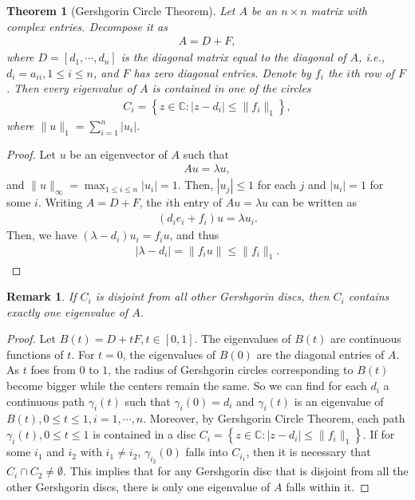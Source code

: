 \documentclass[10pt]{book}
\newtheorem{theorem}{Theorem}[chapter]
\newtheorem{remark}{Remark}[chapter]
\theoremstyle{definition}
\numberwithin{equation}{chapter}
\begin{document}
\begin{subappendices}
\begin{theorem}[Gershgorin Circle Theorem]
Let $A$ be an $n \times n$ matrix with complex entries. Decompose it as 
\begin{align*}
    A = D + F,
\end{align*}
where $D = \left[d_1, \cdots, d_n\right]$ is the diagonal matrix equal to the diagonal of $A$, i.e., $d_i = a_{ii}, 1 \leq i \leq n$, and $F$ has zero diagonal entries. Denote by $f_i$ the $i$th row of $F$. Then every eigenvalue of $A$ is contained in one of the circles
\begin{align*}
    C_i = \left\{z \in \mathbb{C}: |z - d_i| \leq \|f_i\|_1 \right\},
\end{align*}
where $\|u\|_1 = \sum^n_{i=1} |u_i|$.
\end{theorem}
\begin{proof}
Let $u$ be an eigenvector of $A$ such that
\begin{align*}
    Au = \lambda u,
\end{align*}
and $\|u\|_\infty = \max_{1\leq i \leq n}|u_i| = 1$. Then, $|u_j| \leq 1$ for each $j$ and $|u_i| = 1$ for some $i$. Writing $A = D + F$, the $i$th entry of $Au = \lambda u$ can be written as 
\begin{align*}
    (d_i e_i + f_i)u = \lambda u_i.
\end{align*}
Then, we have $(\lambda - d_i)u_i = f_i u$, and thus
\begin{align*}
    |\lambda - d_i| = \|f_i u\| \leq \|f_i\|_1.
\end{align*}
\end{proof}

\begin{remark}
If $C_i$ is disjoint from all other Gershgorin discs, then $C_i$ contains exactly one eigenvalue of $A$.
\end{remark}
\begin{proof}
Let $B(t) = D + tF, t \in [0,1]$. The eigenvalues of $B(t)$ are continuous functions of $t$. For $t = 0$, the eigenvalues of $B(0)$ are the diagonal entries of $A$. As $t$ foes from $0$ to $1$, the radius of Gershgorin circles corresponding to $B(t)$ become bigger while the centers remain the same. So we can find for each $d_i$ a continuous path $\gamma_i(t)$ such that $\gamma_i(0) = d_i$ and $\gamma_i(t)$ is an eigenvalue of $B(t), 0 \leq t \leq 1, i = 1, \cdots, n$. Moreover, by Gershgorin Circle Theorem, each path $\gamma_i(t), 0 \leq t \leq 1$ is contained in a disc $C_i = \left\{z \in \mathbb{C}: |z - d_i| \leq \|f_i\|_1 \right\}$. If for some $i_1$ and $i_2$ with $i_1 \neq i_2$, $\gamma_{i_2}(0)$ falls into $C_{i_1}$, then it is necessary that $C_i \cap C_2 \neq \emptyset$. This implies that for any Gershgorin disc that is disjoint from all the other Gershgorin discs, there is only one eigenvalue of $A$ falls within it.
\end{proof}







\end{subappendices}
\end{document}
